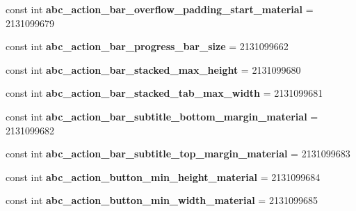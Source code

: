 \begin{DoxyCompactItemize}
\mbox{\label{classXaria_1_1Resource_1_1Dimension_a71ac01b78eb97ffce5780a63ca03f9bb}} 
const int {\bfseries abc\+\_\+action\+\_\+bar\+\_\+overflow\+\_\+padding\+\_\+start\+\_\+material} = 2131099679
\item 
\mbox{\label{classXaria_1_1Resource_1_1Dimension_a9b5d1bfb15282eecbb67f6339720c3a0}} 
const int {\bfseries abc\+\_\+action\+\_\+bar\+\_\+progress\+\_\+bar\+\_\+size} = 2131099662
\item 
\mbox{\label{classXaria_1_1Resource_1_1Dimension_a38ad0f47ba30b02168d2b2fa5bd15216}} 
const int {\bfseries abc\+\_\+action\+\_\+bar\+\_\+stacked\+\_\+max\+\_\+height} = 2131099680
\item 
\mbox{\label{classXaria_1_1Resource_1_1Dimension_a9c7a760e48ab29b44ba797ed21d368a2}} 
const int {\bfseries abc\+\_\+action\+\_\+bar\+\_\+stacked\+\_\+tab\+\_\+max\+\_\+width} = 2131099681
\item 
\mbox{\label{classXaria_1_1Resource_1_1Dimension_a386b4a701d1b8c1bfb37ad50e2db4b49}} 
const int {\bfseries abc\+\_\+action\+\_\+bar\+\_\+subtitle\+\_\+bottom\+\_\+margin\+\_\+material} = 2131099682
\item 
\mbox{\label{classXaria_1_1Resource_1_1Dimension_a15c786630503e1e1d40d6e3ce519a08c}} 
const int {\bfseries abc\+\_\+action\+\_\+bar\+\_\+subtitle\+\_\+top\+\_\+margin\+\_\+material} = 2131099683
\item 
\mbox{\label{classXaria_1_1Resource_1_1Dimension_ac7f9638712f454aaf3845e0d0af6e591}} 
const int {\bfseries abc\+\_\+action\+\_\+button\+\_\+min\+\_\+height\+\_\+material} = 2131099684
\item 
\mbox{\label{classXaria_1_1Resource_1_1Dimension_a61f35efb8c6cccb21f4f9f2fba08dc9d}} 
const int {\bfseries abc\+\_\+action\+\_\+button\+\_\+min\+\_\+width\+\_\+material} = 2131099685
\item 
\mbox{\label{classXaria_1_1Resource_1_1Dimension_a9c08cc2dcefa06707aaa394f1abaad7c}} 

\end{DoxyCompactItemize}
